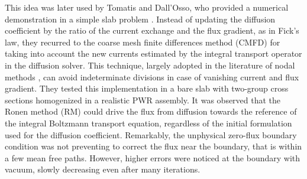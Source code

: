 \documentclass{ictt26}
\begin{document}
This idea was later used by Tomatis and Dall'Osso, who provided a numerical demonstration in a simple slab problem \cite{tomatis2011application}. Instead of updating the diffusion coefficient by the ratio of the current exchange and the flux gradient, as in Fick's law, they recurred to the coarse mesh finite differences method (CMFD) for taking into account the new currents estimated by the integral transport operator in the diffusion solver.
%
%
This technique, largely adopted in the literature of nodal methods \cite{smith1983nodal,lawrence1986progress}, can avoid indeterminate divisions in case of vanishing current and flux gradient. They tested this implementation in a bare slab with two-group cross sections homogenized in a realistic PWR assembly. It was observed that the Ronen method (RM) could drive the flux from diffusion towards the reference of the integral Boltzmann transport equation, regardless of the initial formulation used for the diffusion coefficient. Remarkably, the unphysical zero-flux boundary condition was not preventing to correct the flux near the boundary, that is within a few mean free paths. However, higher errors were noticed at the boundary with vacuum, slowly decreasing even after many iterations.%
%
%
\end{document}
